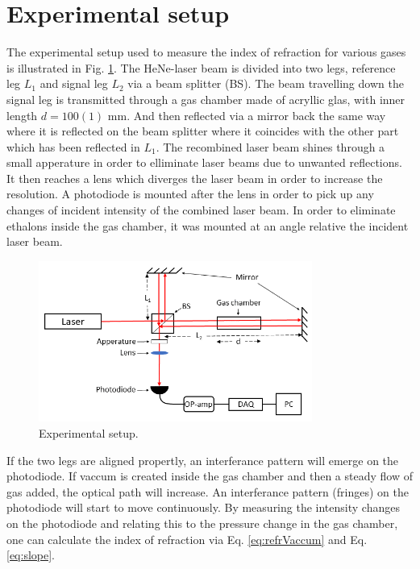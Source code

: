 
\section{Experimental setup}

The experimental setup used to measure the index of refraction for various gases is illustrated in Fig. \ref{fig:experimentalSetup}. The HeNe-laser beam is divided into two legs, reference leg $L_1$ and signal leg $L_2$ via a beam splitter (BS). The beam travelling down the signal leg is transmitted through a gas chamber made of acryllic glas, with inner length $d=100(1)$ mm. And then reflected via a mirror back the same way where it is reflected on the beam splitter where it coincides with the other part which has been reflected in $L_1$. The recombined laser beam shines through a small apperature in order to elliminate laser beams due to unwanted reflections. It then reaches a lens which diverges the laser beam in order to increase the resolution. A photodiode is mounted after the lens in order to pick up any changes of incident intensity of the combined laser beam. In order to eliminate ethalons inside the gas chamber, it was mounted at an angle relative the incident laser beam.

\begin{figure}[H]
  \centering
  \includegraphics[width=0.8\textwidth]{Exp_setup.png}
  \caption{Experimental setup. }
  \label{fig:experimentalSetup}
\end{figure}

If the two legs are aligned propertly, an interferance pattern will emerge on the photodiode. If vaccum is created inside the gas chamber and then a steady flow of gas added, the optical path will increase. An interferance pattern (fringes) on the photodiode  will start to move continuously. By measuring the intensity changes on the photodiode and relating this to the pressure change in the gas chamber, one can calculate the index of refraction via Eq. \ref{eq:refrVaccum} and Eq. \ref{eq:slope}.

